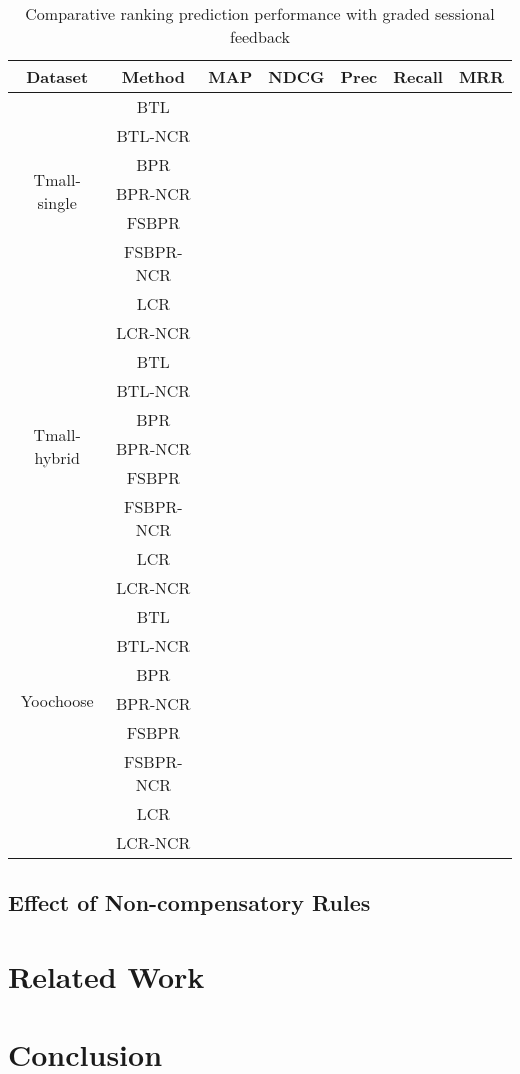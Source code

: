 \documentclass[letterpaper]{article} %
\begin{document}
\begin{table}[htp]
\tiny
\caption{Comparative ranking prediction performance with graded sessional feedback}
\begin{center}
\begin{tabular}{|c|c|c|c|c|c|c|}
\hline
Dataset & Method & MAP & NDCG & Prec & Recall & MRR \\\hline
\multirow{6}{*}{Tmall-single} & BTL & & & & & \\\cline{2-7}
 & BTL-NCR & & & & & \\\cline{2-7}
 & BPR & & & & & \\\cline{2-7}
 & BPR-NCR & & & & & \\\cline{2-7}
 & FSBPR & & & & & \\\cline{2-7}
  & FSBPR-NCR & & & & & \\\cline{2-7}
   & LCR & & & & & \\\cline{2-7}
 & LCR-NCR & & & & & \\\hline
\multirow{6}{*}{Tmall-hybrid} & BTL & & & & & \\\cline{2-7}
 & BTL-NCR & & & & & \\\cline{2-7}
 & BPR & & & & & \\\cline{2-7}
 & BPR-NCR & & & & & \\\cline{2-7}
 & FSBPR & & & & & \\\cline{2-7}
  & FSBPR-NCR & & & & & \\\cline{2-7}
   & LCR & & & & & \\\cline{2-7}
 & LCR-NCR & & & & & \\\hline
\multirow{6}{*}{Yoochoose} & BTL & & & & & \\\cline{2-7}
 & BTL-NCR & & & & & \\\cline{2-7}
 & BPR & & & & & \\\cline{2-7}
 & BPR-NCR & & & & & \\\cline{2-7}
 & FSBPR & & & & & \\\cline{2-7}
  & FSBPR-NCR & & & & & \\\cline{2-7}
   & LCR & & & & & \\\cline{2-7}
 & LCR-NCR & & & & & \\\hline
\end{tabular}
\end{center}
\label{tab:ratingresult}
\end{table}%


\subsection{Effect of Non-compensatory Rules}

\section{Related Work}\label{sec:relatedwork}

\section{Conclusion}\label{sec:conclusion}




\end{document}
